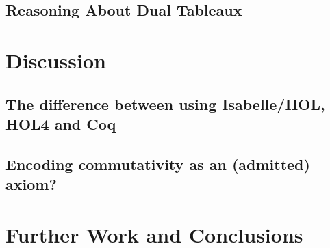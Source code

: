 \documentclass[a4paper]{article}
\begin{document}
\subsection{Reasoning About Dual Tableaux}

\section{Discussion}

\subsection{The difference between using Isabelle/HOL, HOL4 and Coq}

\subsection{Encoding commutativity as an (admitted) axiom?}

\section{Further Work and Conclusions}
\end{document}
